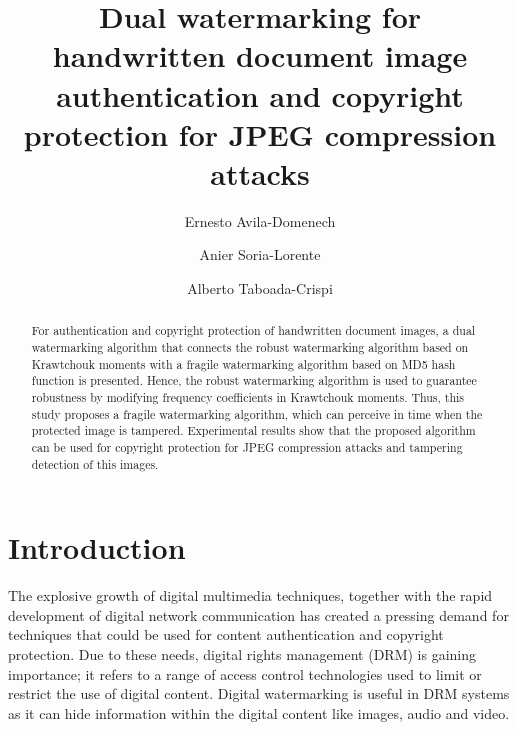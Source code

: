 \documentclass[runningheads]{llncs}
\begin{document}
%
\title{Dual watermarking for handwritten document image authentication and copyright protection for JPEG compression attacks}
%
%
\author{Ernesto Avila-Domenech \and
Anier Soria-Lorente \and
Alberto Taboada-Crispi}
%
%
%
\maketitle              %
%
\begin{abstract}
For authentication and copyright protection of handwritten document images, a dual watermarking algorithm that connects the robust watermarking algorithm based on Krawtchouk moments with a fragile watermarking algorithm based on MD5 hash function is presented. Hence, the robust watermarking algorithm is used to guarantee robustness by modifying frequency coefficients in Krawtchouk moments. Thus, this study proposes a fragile watermarking algorithm, which can perceive in time when the protected image is tampered. Experimental results show that the proposed algorithm can be used for copyright protection for JPEG compression attacks and tampering detection of this images.

\end{abstract}
%
%
%
\section{Introduction}
The explosive growth of digital multimedia techniques, together with the rapid development of digital network communication has created a pressing demand for techniques that could be used for content authentication and copyright protection. Due to these needs, digital rights management (DRM) is gaining importance; it refers to a range of access control technologies used to limit or restrict the use of digital content. Digital watermarking is useful in DRM systems as it can hide information within the digital content like images, audio and video.
\end{document}
